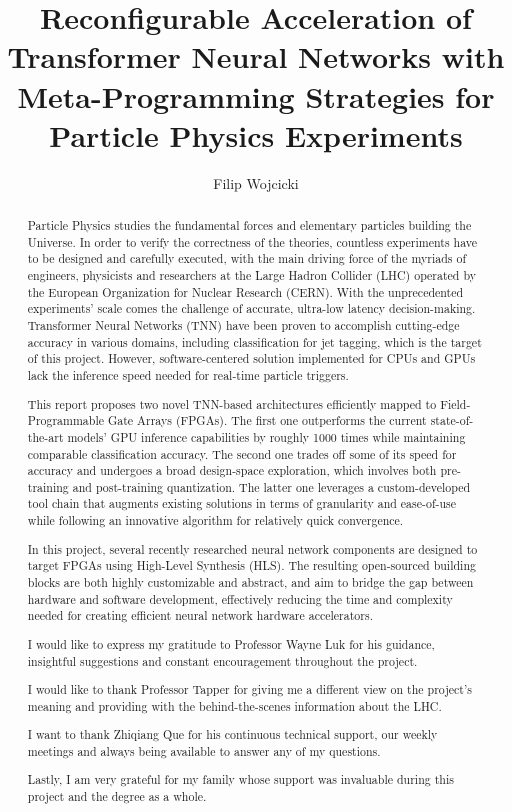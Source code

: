 \documentclass[a4paper, twoside]{report}
\title{Reconfigurable Acceleration of Transformer Neural Networks with Meta-Programming Strategies for Particle Physics Experiments}
\author{Filip Wojcicki}
\begin{document}


\begin{abstract}
  Particle Physics studies the fundamental forces and elementary particles building the Universe. In order to verify the correctness of the theories, countless experiments have to be designed and carefully executed, with the main driving force of the myriads of engineers, physicists and researchers at the Large Hadron Collider (LHC) operated by the European Organization for Nuclear Research (CERN). With the unprecedented experiments' scale comes the challenge of accurate, ultra-low latency decision-making. Transformer Neural Networks (TNN) have been proven to accomplish cutting-edge accuracy in various domains, including classification for jet tagging, which is the target of this project. However, software-centered solution implemented for CPUs and GPUs lack the inference speed needed for real-time particle triggers.
  
  This report proposes two novel TNN-based architectures efficiently mapped to Field-Programmable Gate Arrays (FPGAs). The first one outperforms the current state-of-the-art models' GPU inference capabilities by roughly 1000  times while maintaining comparable classification accuracy. The second one trades off some of its speed for accuracy and undergoes a broad design-space exploration, which involves both pre-training and post-training quantization. The latter one leverages a custom-developed tool chain that augments existing solutions in terms of granularity and ease-of-use while following an innovative algorithm for relatively quick convergence.

  In this project, several recently researched neural network components are designed to target FPGAs using High-Level Synthesis (HLS). The resulting open-sourced building blocks are both highly customizable and abstract, and aim to bridge the gap between hardware and software development, effectively reducing the time and complexity needed for creating efficient neural network hardware accelerators.
\end{abstract}

\renewcommand{\abstractname}{Acknowledgements}
\begin{abstract}
I would like to express my gratitude to Professor Wayne Luk for his guidance, insightful suggestions and constant encouragement throughout the project.
\newline

I would like to thank Professor Tapper for giving me a different view on the project's meaning and providing with the behind-the-scenes information about the LHC.
\newline

I want to thank Zhiqiang Que for his continuous technical support, our weekly meetings and always being available to answer any of my questions.
\newline

Lastly, I am very grateful for my family whose support was invaluable during this project and the degree as a whole.
\end{abstract}
\end{document}
